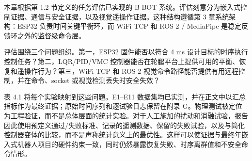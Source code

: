 \documentclass[12pt, a4paper]{article}
\begin{document}
本章根据第 1.2 节定义的任务评估已实现的 B-BOT 系统。评估刻意分为嵌入式控制证据、通信与安全证据，以及视觉遥操作证据。这种结构遵循第 3 章系统架构：ESP32 负责时间关键平衡环，而 WiFi TCP 和 ROS 2 / MediaPipe 是稳定反馈环之外的监督级命令层。

评估围绕三个问题组织。第一，ESP32 固件能否以符合 4 ms 设计目标的时序执行控制任务？第二，LQR/PID/VMC 控制器能否在轮腿平台上提供可用的平衡、恢复和遥操作行为？第三，WiFi TCP 和 ROS 2 视觉命令路径能否提供有用远程控制，并在命令、socket 或视觉检测丢失时安全失效？

表 4.1 将每个实验映射到这些问题。E1--E11 数据集均已实测，并在正文中以汇总指标作为最终证据；原始时间序列和逐试验日志保留在附录 G。物理测试被定位为工程验证，而不是总体层面的统计实验。对于人工施加的扰动和消融试验，报告因此使用预定义通过/失败标准、记录的遥测数据、保留的失败试验，以及与简化控制器变体的比较，而不是声称统计意义上的最优性。这样可以使证据与最终年嵌入式机器人项目的硬件约束一致，同时仍然暴露恢复失败、时序离群值和不安全命令情形。
\end{document}
